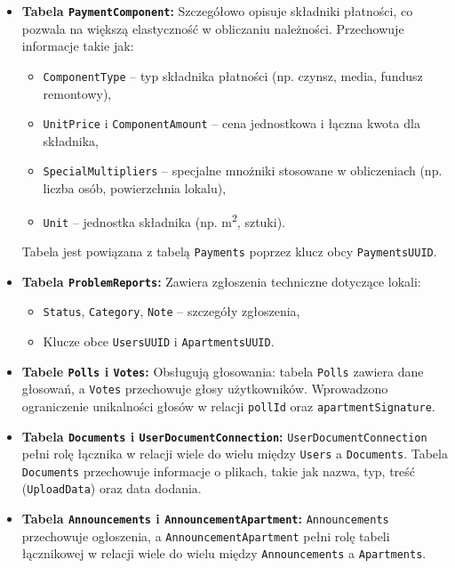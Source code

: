 \begin{itemize}
    \item \textbf{Tabela \texttt{PaymentComponent}:}
    Szczegółowo opisuje składniki płatności, co pozwala na większą elastyczność w obliczaniu należności. Przechowuje informacje takie jak:
    \begin{itemize}
        \item \texttt{ComponentType} -- typ składnika płatności (np. czynsz, media, fundusz remontowy),
        \item \texttt{UnitPrice} i \texttt{ComponentAmount} -- cena jednostkowa i łączna kwota dla składnika,
        \item \texttt{SpecialMultipliers} -- specjalne mnożniki stosowane w obliczeniach (np. liczba osób, powierzchnia lokalu),
        \item \texttt{Unit} -- jednostka składnika (np. m\textsuperscript{2}, sztuki).
    \end{itemize}
    Tabela jest powiązana z tabelą \texttt{Payments} poprzez klucz obcy \texttt{PaymentsUUID}.

    \item \textbf{Tabela \texttt{ProblemReports}:}
    Zawiera zgłoszenia techniczne dotyczące lokali:
    \begin{itemize}
        \item \texttt{Status}, \texttt{Category}, \texttt{Note} -- szczegóły zgłoszenia,
        \item Klucze obce \texttt{UsersUUID} i \texttt{ApartmentsUUID}.
    \end{itemize}

    \item \textbf{Tabele \texttt{Polls} i \texttt{Votes}:} 
		Obsługują głosowania: tabela \texttt{Polls} zawiera dane głosowań, a \texttt{Votes} przechowuje głosy użytkowników. Wprowadzono ograniczenie unikalności głosów w relacji \texttt{pollId} oraz \texttt{apartmentSignature}.

    \item \textbf{Tabela \texttt{Documents} i \texttt{UserDocumentConnection}:}
    \texttt{UserDocumentConnection} pełni rolę łącznika w relacji wiele do wielu między \texttt{Users} a \texttt{Documents}. Tabela \texttt{Documents} przechowuje informacje o plikach, takie jak nazwa, typ, treść (\texttt{UploadData}) oraz data dodania.
    
    \item \textbf{Tabela \texttt{Announcements} i \texttt{AnnouncementApartment}:}
    \texttt{Announcements} przechowuje ogłoszenia, a \texttt{AnnouncementApartment} pełni rolę tabeli łącznikowej w relacji wiele do wielu między \texttt{Announcements} a \texttt{Apartments}.


\end{itemize}
